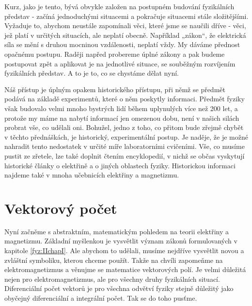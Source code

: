 
    Kurz, jako je tento, bývá obvykle založen na postupném budování fyzikálních představ - začíná 
    jednoduchými situacemi a pokračuje situacemi stále složitějšími. Vyžaduje to, abychom neustále 
    zapomínali věci, které jsme se naučili dříve - věci, jež platí v určitých situacích, ale 
    neplatí obecně. Například „zákon“, že elektrická síla se mění s druhou mocninou vzdálenosti, 
    neplatí vždy. My dáváme přednost opačnému postupu. Raději napřed probereme úplné zákony a pak 
    budeme postupovat zpět a aplikovat je na jednotlivé situace, se souběžným rozvíjením 
    fyzikálních představ. A to je to, co se chystáme dělat nyní.
    
    Náš přístup je úplným opakem historického přístupu, při němž se předmět podává na základě 
    experimentů, které o něm poskytly informaci. Předmět fyziky však budovalo velmi mnoho bystrých 
    lidí během uplynulých více než 200 let, a protože my máme na nabytí informací jen omezenou 
    dobu, není v našich silách probrat vše, co udělali oni. Bohužel, jedno z toho, co přitom bude 
    zřejmě chybět v těchto přednáškách, je historický, experimentální postup. Je naděje, že je 
    možné nahradit tento nedostatek v určité míře laboratorními cvičeními. Vše, co musíme pustit ze 
    zřetele, lze také doplnit čtením encyklopedií, v nichž se občas vyskytují historické 
    články o elektřině a o jiných oblastech fyziky. Historickou informaci najdeme také v mnoha 
    učebnicích elektřiny a magnetizmu.
    
  \section{Vektorový počet}\label{fyz:IIchapIIsecII}
    Nyní začněme s abstraktním, matematickým pohledem na teorii elektřiny a magnetizmu. Základní 
    myšlenkou je vysvětlit význam zákonů formulovaných v kapitole \ref{fyz:IIchapI}. Ale abychom 
    to udělali, musíme nejdříve vysvětlit novou a zvláštní symboliku, kterou chceme použít. Takže 
    na chvíli zapomeňme na elektromagnetizmus a věnujme se matematice vektorových polí. Je velmi 
    důležitá nejen pro elektromagnetizmus, ale pro všechny druhy fyzikálních situací. Diferenciální 
    počet vektorů je pro všechna odvětví fyziky stejně důležitý jako obyčejný diferenciální a 
    integrální počet. Tak se do toho pusťme.

